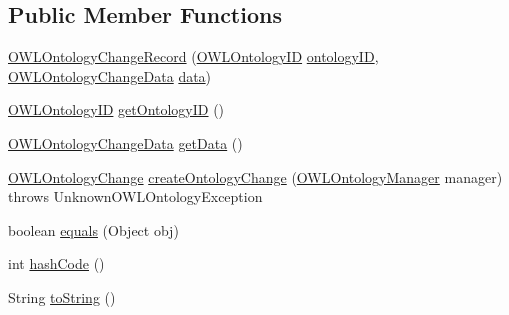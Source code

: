 \subsection*{Public Member Functions}
\begin{DoxyCompactItemize}
\item 
\hyperlink{classorg_1_1semanticweb_1_1owlapi_1_1change_1_1_o_w_l_ontology_change_record_abc224d0d7b85f0a2dd7cea0380b0ada8}{O\-W\-L\-Ontology\-Change\-Record} (\hyperlink{classorg_1_1semanticweb_1_1owlapi_1_1model_1_1_o_w_l_ontology_i_d}{O\-W\-L\-Ontology\-I\-D} \hyperlink{classorg_1_1semanticweb_1_1owlapi_1_1change_1_1_o_w_l_ontology_change_record_a266aa672db07998a4f2a42841693290b}{ontology\-I\-D}, \hyperlink{classorg_1_1semanticweb_1_1owlapi_1_1change_1_1_o_w_l_ontology_change_data}{O\-W\-L\-Ontology\-Change\-Data} \hyperlink{classorg_1_1semanticweb_1_1owlapi_1_1change_1_1_o_w_l_ontology_change_record_ad4672080c310df7689109cebcf66ed10}{data})
\item 
\hyperlink{classorg_1_1semanticweb_1_1owlapi_1_1model_1_1_o_w_l_ontology_i_d}{O\-W\-L\-Ontology\-I\-D} \hyperlink{classorg_1_1semanticweb_1_1owlapi_1_1change_1_1_o_w_l_ontology_change_record_a56c0ea2248fd87ed9a90c801d17d9921}{get\-Ontology\-I\-D} ()
\item 
\hyperlink{classorg_1_1semanticweb_1_1owlapi_1_1change_1_1_o_w_l_ontology_change_data}{O\-W\-L\-Ontology\-Change\-Data} \hyperlink{classorg_1_1semanticweb_1_1owlapi_1_1change_1_1_o_w_l_ontology_change_record_ad45ed0e7ca0f21da0e792be9a7ab6291}{get\-Data} ()
\item 
\hyperlink{classorg_1_1semanticweb_1_1owlapi_1_1model_1_1_o_w_l_ontology_change}{O\-W\-L\-Ontology\-Change} \hyperlink{classorg_1_1semanticweb_1_1owlapi_1_1change_1_1_o_w_l_ontology_change_record_a3152884d9aa006d4a8278519a4f6a775}{create\-Ontology\-Change} (\hyperlink{interfaceorg_1_1semanticweb_1_1owlapi_1_1model_1_1_o_w_l_ontology_manager}{O\-W\-L\-Ontology\-Manager} manager)  throws Unknown\-O\-W\-L\-Ontology\-Exception 
\item 
boolean \hyperlink{classorg_1_1semanticweb_1_1owlapi_1_1change_1_1_o_w_l_ontology_change_record_a58afad3a4151deaeea86096fd40915ba}{equals} (Object obj)
\item 
int \hyperlink{classorg_1_1semanticweb_1_1owlapi_1_1change_1_1_o_w_l_ontology_change_record_aaf8c1b6340bc4590f784325838806cf1}{hash\-Code} ()
\item 
String \hyperlink{classorg_1_1semanticweb_1_1owlapi_1_1change_1_1_o_w_l_ontology_change_record_a1520dddec7d39dc68fdb725524d760b5}{to\-String} ()
\end{DoxyCompactItemize}
